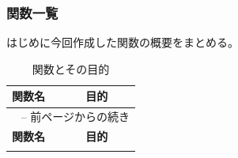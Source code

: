 \documentclass[upIatex,dvipdfmx,a4paper]{jsarticle}
\begin{document}
\subsubsection{関数一覧}
はじめに今回作成した関数の概要をまとめる。
\begin{longtable}{lp{}} %
    \caption{関数とその目的}
    \label{tab:functions_long} \\

    \toprule
    \textbf{関数名} & \textbf{目的} \\
    \midrule
    \endfirsthead

    \multicolumn{2}{l}{\tablename~\thetable{} -- 前ページからの続き} \\
    \toprule
    \textbf{関数名} & \textbf{目的} \\
    \midrule
    \endhead

    \bottomrule
    \endlastfoot


\end{longtable}
\end{document}
